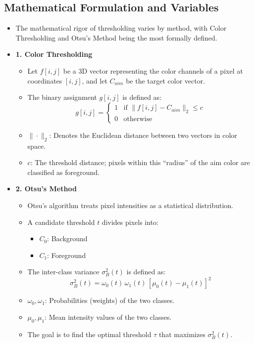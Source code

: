 \documentclass[12pt]{article}
\begin{document}
\subsection{Mathematical Formulation and Variables}
\begin{itemize}
    \item The mathematical rigor of thresholding varies by method, with Color Thresholding and Otsu's Method being the most formally defined.

    \item \textbf{1. Color Thresholding}
          \begin{itemize}
              \item Let $f[i,j]$ be a 3D vector representing the color channels of a pixel at coordinates $[i,j]$, and let $C_{aim}$ be the target color vector.
              \item The binary assignment $g[i,j]$ is defined as:
                    \[
                        g[i,j] =
                        \begin{cases}
                            1 & \text{if } \|f[i,j] - C_{aim}\|_2 \le c \\
                            0 & \text{otherwise}
                        \end{cases}
                    \]
              \item $\|\cdot\|_2$: Denotes the Euclidean distance between two vectors in color space.
              \item $c$: The threshold distance; pixels within this ``radius'' of the aim color are classified as foreground.
          \end{itemize}

    \item \textbf{2. Otsu's Method}
          \begin{itemize}
              \item Otsu's algorithm treats pixel intensities as a statistical distribution.
              \item A candidate threshold $t$ divides pixels into:
                    \begin{itemize}
                        \item $C_0$: Background
                        \item $C_1$: Foreground
                    \end{itemize}
              \item The inter-class variance $\sigma_B^2(t)$ is defined as:
                    \[
                        \sigma_B^2(t) = \omega_0(t)\,\omega_1(t)\,[\mu_0(t) - \mu_1(t)]^2
                    \]
              \item $\omega_0, \omega_1$: Probabilities (weights) of the two classes.
              \item $\mu_0, \mu_1$: Mean intensity values of the two classes.
              \item The goal is to find the optimal threshold $\tau$ that maximizes $\sigma_B^2(t)$.
          \end{itemize}
\end{itemize}
\end{document}
